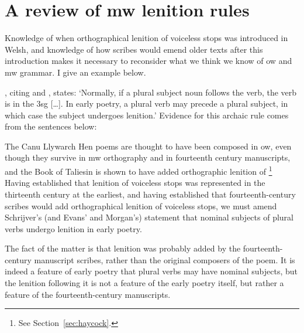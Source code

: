 \section{A review of \gls{mw} lenition rules}
\label{sec:cons-other-ideas}
Knowledge of when orthographical lenition of voiceless stops was introduced in Welsh, and knowledge of how scribes would emend older texts after this introduction makes it necessary to reconsider what we think we know of \gls{ow} and \gls{mw} grammar. I give an example below.

\Textcite[2]{schrijver_free_2010}, citing \textcite[18, 179]{evans_grammar_1964} and \textcite[193n]{morgan_y_1952}, states:
`Normally, if a plural subject noun follows the verb, the verb is in the 3sg […]. In early poetry, a plural verb may precede a plural subject, in which case the subject undergoes lenition.' Evidence for this archaic rule comes from the sentences below:
\begin{mwl}
\end{mwl}

The Canu Llywarch Hen poems are thought to have been composed in \gls{ow}, even though they survive in \gls{mw} orthography and in fourteenth century manuscripts, and the Book of Taliesin is shown to have added orthographic lenition of \footnote{See Section~\ref{sec:haycock}.} Having established that  lenition of voiceless stops was represented in the thirteenth century at the earliest, and having established that fourteenth-century scribes would add orthographical lenition of voiceless stops, we must amend Schrijver's (and Evans' and Morgan's) statement that nominal subjects of plural verbs undergo lenition in early poetry.

The fact of the matter is that lenition was probably added by the fourteenth-century manuscript scribes, rather than the original composers of the poem. It is indeed a feature of early poetry that plural verbs may have nominal subjects, but the lenition following it is not a feature of the early poetry itself, but rather a feature of the fourteenth-century manuscripts.

